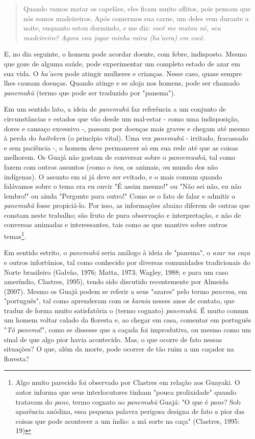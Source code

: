 \begin{quote}
Quando vamos matar os capelães, eles ficam muito aflitos, pois pensam
que nós somos madeireiros. Após comermos sua carne, um deles vem durante
a noite, enquanto estou dormindo, e me diz: \emph{você me matou né, seu
madeireiro? Agora vou jogar minha raiva (ha'aera) em você}.
\end{quote}

E, no dia seguinte, o homem pode acordar doente, com febre, indisposto.
Mesmo que goze de alguma saúde, pode experimentar um completo estado de
azar em sua vida. O \emph{ha'aera} pode atingir mulheres e crianças.
Nesse caso, quase sempre lhes causam doenças. Quando atinge e se aloja
nos homens, pode ser chamado \emph{panemuhũ} (termo que pode ser
traduzido por "panema").

Em um sentido lato, a ideia de \emph{panemuhũ} faz referência a um
conjunto de circunstâncias e estados que vão desde um mal-estar - como
uma indisposição, dores e cansaço excessivo -, passam por doenças mais
graves e chegam até mesmo à perda do \emph{haitekera} (o princípio
vital). Uma vez \emph{panemuhũ} - irritado, fracassado e sem paciência
-, o homem deve permanecer só em sua rede até que as coisas melhorem. Os
Guajá não gostam de conversar sobre o \emph{paneemuuhũ}, tal como fazem
com outros assuntos (como o \emph{iwa}, os animais, ou mundo dos não
indígenas). O assunto em si já deve ser evitado, e o mais comum quando
falávamos sobre o tema era eu ouvir "É assim mesmo!" ou "Não sei não, eu
não lembro!" ou ainda "Pergunte para outro!" Como se o fato de falar e
admitir o \emph{panemuhũ} fosse propiciá-lo. Por isso, as informações
abaixo diferem de outras que constam neste trabalho; são fruto de pura
observação e interpretação, e não de conversas animadas e interessantes,
tais como as que mantive sobre outros temas\footnote{Algo muito parecido
  foi observado por Clastres em relação aos Guayaki. O autor informa que
  seus interlocutores tinham "pouca prolixidade" quando tratavam do
  \emph{pane}, termo cognato ao \emph{panemuhũ} Guajá: "O que é
  \emph{pane}? Sob aparência anódina, essa pequena palavra perigosa
  designa de fato a pior das coisas que pode acontecer a um índio: a má
  sorte na caça" (Clastres, 1995: 19)}.

Em sentido estrito, o \emph{panemuhũ} seria análogo à ideia de "panema",
o \emph{azar na caça} e outros infortúnios, tal como conhecido por
diversas comunidades tradicionais do Norte brasileiro (Galvão, 1976;
Matta, 1973; Wagley, 1988; e para um caso ameríndio, Clastres, 1995),
tendo sido discutido recentemente por Almeida (2007). Mesmo os Guajá
podem se referir a seus "azares" pelo termo \emph{panema}, em
"português", tal como aprenderam com os \emph{karaia} nesses anos de
contato, que traduz de forma muito satisfatória o (termo cognato)
\emph{panemuhũ}. É muito comum um homem voltar calado da floresta e, ao
chegar em casa, comentar em português "\emph{Tô panema}!", como se
dissesse que a caçada foi improdutiva, ou mesmo como um sinal de que
algo pior havia acontecido. Mas, o que ocorre de fato nessas situações?
O que, além da morte, pode ocorrer de tão ruim a um caçador na floresta?

